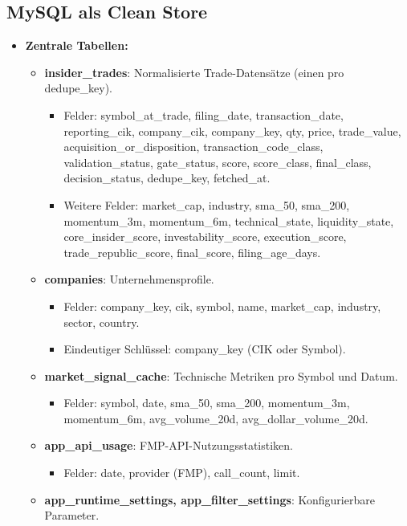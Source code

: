 \subsection{MySQL als Clean Store}
\begin{itemize}
  \item \textbf{Zentrale Tabellen:}
    \begin{itemize}
      \item \textbf{insider\_trades}: Normalisierte Trade-Datensätze (einen pro dedupe\_key).
        \begin{itemize}
          \item Felder: symbol\_at\_trade, filing\_date, transaction\_date, reporting\_cik, company\_cik, company\_key, qty, price, trade\_value, acquisition\_or\_disposition, transaction\_code\_class, validation\_status, gate\_status, score, score\_class, final\_class, decision\_status, dedupe\_key, fetched\_at.
          \item Weitere Felder: market\_cap, industry, sma\_50, sma\_200, momentum\_3m, momentum\_6m, technical\_state, liquidity\_state, core\_insider\_score, investability\_score, execution\_score, trade\_republic\_score, final\_score, filing\_age\_days.
        \end{itemize}
      \item \textbf{companies}: Unternehmensprofile.
        \begin{itemize}
          \item Felder: company\_key, cik, symbol, name, market\_cap, industry, sector, country.
          \item Eindeutiger Schlüssel: company\_key (CIK oder Symbol).
        \end{itemize}
      \item \textbf{market\_signal\_cache}: Technische Metriken pro Symbol und Datum.
        \begin{itemize}
          \item Felder: symbol, date, sma\_50, sma\_200, momentum\_3m, momentum\_6m, avg\_volume\_20d, avg\_dollar\_volume\_20d. %
        \end{itemize}
      \item \textbf{app\_api\_usage}: FMP-API-Nutzungsstatistiken.
        \begin{itemize}
          \item Felder: date, provider (FMP), call\_count, limit.
        \end{itemize}
      \item \textbf{app\_runtime\_settings, app\_filter\_settings}: Konfigurierbare Parameter.

\end{itemize}
\end{itemize}
